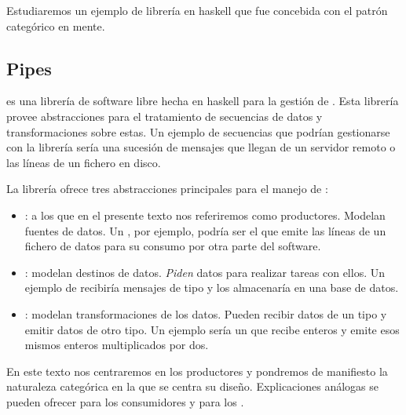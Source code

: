 Estudiaremos un ejemplo de librería en haskell que fue concebida
con el patrón categórico en mente.

\subsection{Pipes}
 es una librería de software libre hecha en haskell para
la gestión de . Esta librería provee abstracciones para
el tratamiento de secuencias de datos y transformaciones sobre estas.
Un ejemplo de secuencias que podrían gestionarse con la librería
 sería una sucesión de mensajes que llegan de un servidor
remoto o las líneas de un fichero en disco.

La librería ofrece tres abstracciones principales para el manejo
de :
\begin{itemize}
\item {}: a los que en el presente texto nos referiremos
  como productores. Modelan fuentes de datos. Un ,
  por ejemplo, podría ser el que emite las líneas de un fichero de
  datos para su consumo por otra parte del software.
\item {}: modelan destinos de datos. \textit{Piden} datos
  para realizar tareas con ellos. Un ejemplo de 
  recibiría mensajes de tipo  y los almacenaría
  en una base de datos.
\item {}: modelan transformaciones de los datos. Pueden recibir
  datos de un tipo y emitir datos de otro tipo. Un ejemplo sería un
   que recibe enteros y emite esos mismos enteros multiplicados
  por dos.
\end{itemize}

En este texto nos centraremos en los productores y pondremos de manifiesto
la naturaleza categórica en la que se centra su diseño. Explicaciones
análogas se pueden ofrecer para los consumidores y para los .

